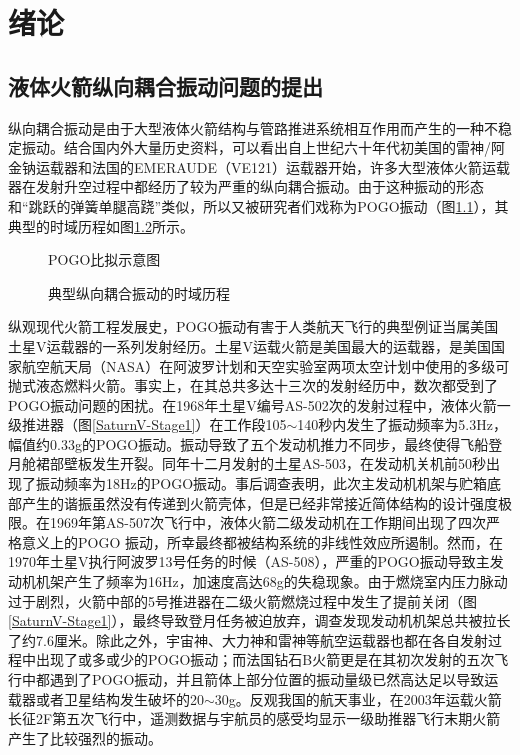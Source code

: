 \chapter{绪论}
\section{液体火箭纵向耦合振动问题的提出}
纵向耦合振动是由于大型液体火箭结构与管路推进系统相互作用而产生的一种不稳定振动\cite{Rubin:1966, Rubin:1970, Rubin:1973}。结合国内外大量历史资料，可以看出自上世纪六十年代初美国的雷神/阿金钠运载器\cite{Leadbetter:1965, Rubin:1966}和法国的EMERAUDE（VE121）\cite{Dordain:1974}运载器开始，许多大型液体火箭运载器在发射升空过程中都经历了较为严重的纵向耦合振动。由于这种振动的形态和“跳跃的弹簧单腿高跷”类似，所以又被研究者们戏称为POGO振动\cite{Rasumoff:1973}（图\ref{POGO-Analog}），其典型的时域历程如图\ref{Typical:POGO}所示。

\begin{figure}[hb]
  \centering
  \caption{POGO比拟示意图}\label{POGO-Analog}
\end{figure}

\begin{figure}[th]
  \centering
  \caption{典型纵向耦合振动的时域历程}\label{Typical:POGO}
\end{figure}

纵观现代火箭工程发展史，POGO振动有害于人类航天飞行的典型例证当属美国土星V运载器的一系列发射经历\cite{Hill:1969, Rich:1969, Jarvinen:1970}。土星V运载火箭是美国最大的运载器，是美国国家航空航天局（NASA）在阿波罗计划和天空实验室两项太空计划中使用的多级可抛式液态燃料火箭。事实上，在其总共多达十三次的发射经历中，数次都受到了POGO振动问题的困扰\cite{Larsen:2008}。在1968年土星V编号AS-502次的发射过程中，液体火箭一级推进器（图\ref{SaturnV-Stage1}）在工作段105$\sim$140秒内发生了振动频率为5.3Hz，幅值约0.33g的POGO振动。振动导致了五个发动机推力不同步，最终使得飞船登月舱裙部壁板发生开裂。同年十二月发射的土星AS-503，在发动机关机前50秒出现了振动频率为18Hz的POGO振动。事后调查表明，此次主发动机机架与贮箱底部产生的谐振虽然没有传递到火箭壳体，但是已经非常接近简体结构的设计强度极限。在1969年第AS-507次飞行中，液体火箭二级发动机在工作期间出现了四次严格意义上的POGO 振动，所幸最终都被结构系统的非线性效应所遏制。然而，在1970年土星V执行阿波罗13号任务的时候（AS-508），严重的POGO振动导致主发动机机架产生了频率为16Hz，加速度高达68g的失稳现象。由于燃烧室内压力脉动过于剧烈，火箭中部的5号推进器在二级火箭燃烧过程中发生了提前关闭（图\ref{SaturnV-Stage1}），最终导致登月任务被迫放弃，调查发现发动机机架总共被拉长了约7.6厘米。除此之外，宇宙神、大力神和雷神等航空运载器也都在各自发射过程中出现了或多或少的POGO振动\cite{Walker:1964, Wagner:1970, Oppenheim:1993}；而法国钻石B火箭更是在其初次发射的五次飞行中都遇到了POGO振动，并且箭体上部分位置的振动量级已然高达足以导致运载器或者卫星结构发生破坏的20$\sim$30g\cite{Dordain:1974}。反观我国的航天事业，在2003年运载火箭长征2F第五次飞行中，遥测数据与宇航员的感受均显示一级助推器飞行末期火箭产生了比较强烈的振动\cite{Ma-Daoyuan:2010, Rong-Kelin:2011}。

